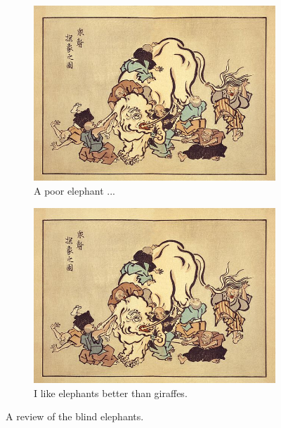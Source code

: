 \documentclass[
  10pt,      %
  a4j,       %
  twocolumn, %
  english,   %
  uplatex,
  dvipdfmx
]{jsarticle}
\begin{document}
\begin{figure}[t]
    \centering
    \begin{subfigure}{0.5\textwidth}
        \includegraphics[clip,width=\textwidth]{fig/elephant.jpg}
        \caption{A poor elephant ...}
        \label{fig:elephant_A}
    \end{subfigure}
    \begin{subfigure}{0.5\textwidth}
        \includegraphics[clip,width=\textwidth]{fig/elephant.jpg}
        \caption{I like elephants better than giraffes.}
        \label{fig:elephant_B}
    \end{subfigure}
    \caption{A review of the blind elephants.}
    \label{fig:elephant}
\end{figure}
\end{document}
